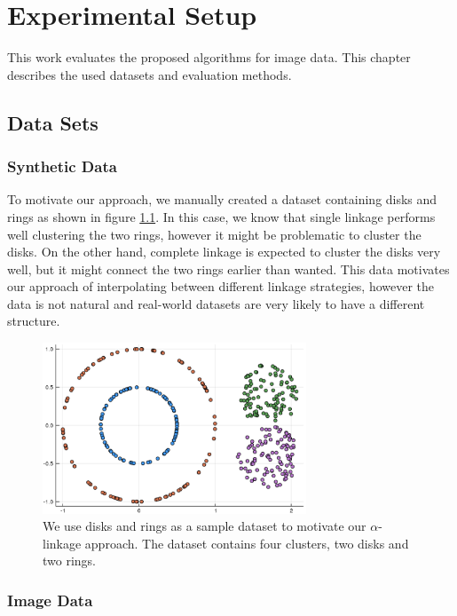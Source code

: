 \chapter{Experimental Setup}
\label{chapter:setup}

This work evaluates the proposed algorithms for image data. This chapter describes the used datasets and evaluation methods.

\section{Data Sets}
\label{chapter:datasets}

\subsection{Synthetic Data}

To motivate our approach, we manually created a dataset containing disks and rings as shown in figure \ref{fig:disksrings}. In this case, we know that single linkage performs well clustering the two rings, however it might be problematic to cluster the disks. On the other hand, complete linkage is expected to cluster the disks very well, but it might connect the two rings earlier than wanted. This data motivates our approach of interpolating between different linkage strategies, however the data is not natural and real-world datasets are very likely to have a different structure. 

\begin{figure}[h]
    \centering
    \includegraphics[width=0.7\textwidth]{images/RingsDisks}
    \caption{We use disks and rings as a sample dataset to motivate our $\alpha$-linkage approach. The dataset contains four clusters, two disks and two rings.}
    \label{fig:disksrings}
\end{figure}

\subsection{Image Data}

